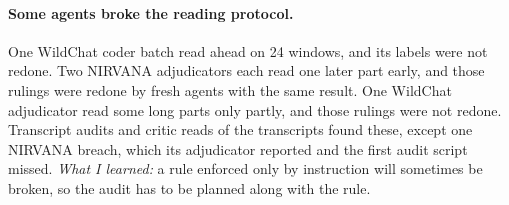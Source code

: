 \documentclass[manuscript,screen]{acmart}
\begin{document}
\paragraph{Some agents broke the reading protocol.} One WildChat coder batch read ahead on 24 windows, and its labels were not redone. Two NIRVANA adjudicators each read one later part early, and those rulings were redone by fresh agents with the same result. One WildChat adjudicator read some long parts only partly, and those rulings were not redone. Transcript audits and critic reads of the transcripts found these, except one NIRVANA breach, which its adjudicator reported and the first audit script missed. \emph{What I learned:} a rule enforced only by instruction will sometimes be broken, so the audit has to be planned along with the rule.




\end{document}
